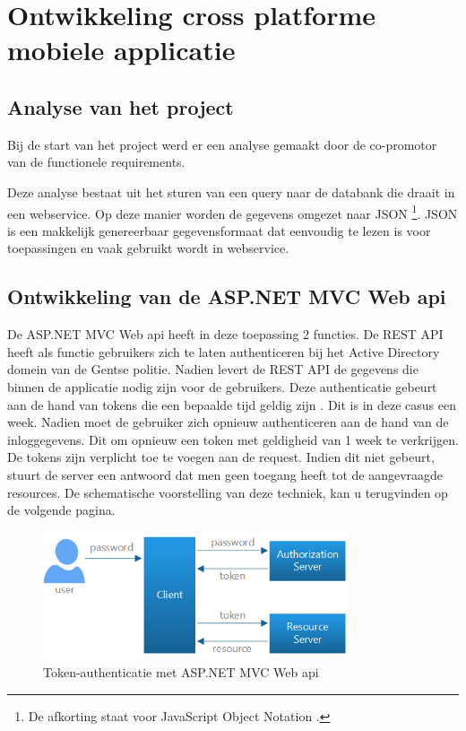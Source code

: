 \chapter{Ontwikkeling cross platforme mobiele applicatie}
\label{ch:ontwikkelingcrossplatformapp}
\section{Analyse van het project}
Bij de start van het project werd er een analyse gemaakt door de co-promotor van de functionele requirements.

Deze analyse bestaat uit het sturen van een query naar de databank die draait in een webservice.
Op deze manier worden de gegevens omgezet naar JSON \footnote{De afkorting staat voor
JavaScript Object Notation \cite{inleidingtotjson2017}.}. JSON is een makkelijk genereerbaar gegevensformaat dat eenvoudig te lezen is voor toepassingen en vaak gebruikt wordt in webservice.

\section{Ontwikkeling van de ASP.NET MVC Web api}
De ASP.NET MVC Web api heeft in deze toepassing 2 functies. De REST API heeft als functie gebruikers zich te laten
authenticeren bij het Active Directory domein van de Gentse politie. Nadien levert de REST API de gegevens die binnen
de applicatie nodig zijn voor de gebruikers. Deze authenticatie gebeurt aan de hand van tokens die een bepaalde tijd geldig zijn \citep{authenticatemvcapplication2017}. Dit is in deze casus een week.  Nadien moet de gebruiker zich opnieuw authenticeren aan de hand van de inloggegevens. Dit om opnieuw een
token met geldigheid van 1 week te verkrijgen. De tokens zijn verplicht toe te voegen aan de request. Indien dit niet gebeurt, stuurt
de server een antwoord dat men geen toegang heeft tot de aangevraagde resources. De schematische voorstelling van deze techniek,
kan u terugvinden op de volgende pagina.

\begin{figure}[ht!]
\centering
\caption{Token-authenticatie met ASP.NET MVC Web api \cite{securewebapi2017}}
\includegraphics[width=90mm]{./img/authentication.png}
\end{figure}

